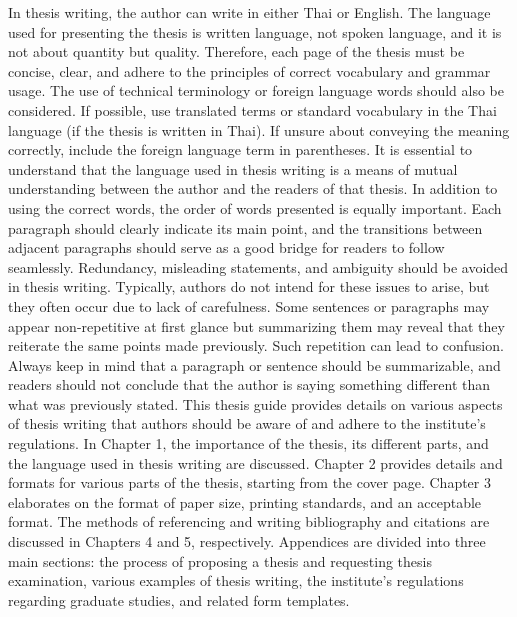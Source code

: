 In thesis writing, the author can write in either Thai or English. The language
used for presenting the thesis is written language, not spoken language, and it is not
about quantity but quality. Therefore, each page of the thesis must be concise, clear,
and adhere to the principles of correct vocabulary and grammar usage. The use of
technical terminology or foreign language words should also be considered. If possible,
use translated terms or standard vocabulary in the Thai language (if the thesis is written
in Thai). If unsure about conveying the meaning correctly, include the foreign language
term in parentheses.
It is essential to understand that the language used in thesis writing is a means
of mutual understanding between the author and the readers of that thesis. In addition
to using the correct words, the order of words presented is equally important. Each
paragraph should clearly indicate its main point, and the transitions between adjacent
paragraphs should serve as a good bridge for readers to follow seamlessly.
Redundancy, misleading statements, and ambiguity should be avoided in thesis
writing. Typically, authors do not intend for these issues to arise, but they often occur
due to lack of carefulness. Some sentences or paragraphs may appear non-repetitive
at first glance but summarizing them may reveal that they reiterate the same points
made previously. Such repetition can lead to confusion. Always keep in mind that a
paragraph or sentence should be summarizable, and readers should not conclude that
the author is saying something different than what was previously stated.
This thesis guide provides details on various aspects of thesis writing that
authors should be aware of and adhere to the institute's regulations. In Chapter 1, the
importance of the thesis, its different parts, and the language used in thesis writing are
discussed. Chapter 2 provides details and formats for various parts of the thesis, starting
from the cover page. Chapter 3 elaborates on the format of paper size, printing
standards, and an acceptable format. The methods of referencing and writing
bibliography and citations are discussed in Chapters 4 and 5, respectively. Appendices
are divided into three main sections: the process of proposing a thesis and requesting
thesis examination, various examples of thesis writing, the institute's regulations
regarding graduate studies, and related form templates.
